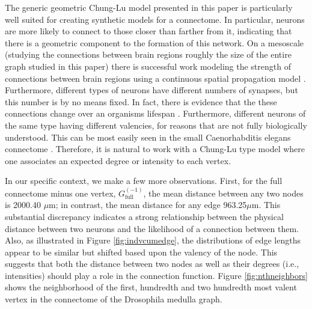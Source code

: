 \documentclass[11]{article}
\newcommand{\fullone}{G_{\textrm{full}}^{(-1)}}
\theoremstyle{remark}
\theoremstyle{definition}
\begin{document}
The generic geometric Chung-Lu model presented in this paper is particularly well suited for creating synthetic models for a connectome. In particular, neurons are more likely to connect to those closer than farther from it, indicating that there is a geometric component to the formation of this network. On a mesoscale (studying the connections between brain regions roughly the size of the entire graph studied in this paper) there is successful work modeling the strength of connections between brain regions using a continuous spatial propagation model \cite{fieldtheory}. Furthermore, different types of neurons have different numbers of synapses, but this number is by no means fixed. In fact, there is evidence that the these connections change over an organisms lifespan \cite{rewiring}. Furthermore, different neurons of the same type having different valencies, for reasons that are not fully biologically understood. This can be most easily seen in the small Caenorhabditis elegans connectome \cite{VarshneyCelegans}. Therefore, it is natural to work with a Chung-Lu type model where one associates an expected degree or intensity to each vertex. 

In our specific context, we make a few more observations. First, for the full connectome minus one vertex, $\fullone$, the mean distance between any two nodes is 2000.40 $\mu$m; in contrast, the mean distance for any edge 963.25$\mu$m. This substantial discrepancy indicates a strong relationship between the physical distance between two neurons and the likelihood of a connection between them. Also, as illustrated in Figure \ref{fig:indvcumedge}, the distributions of edge lengths appear to be similar but shifted based upon the valency of the node. This suggests that both the distance between two nodes as well as their degrees (i.e., intensities) should play a role in the connection function. Figure \ref{fig:nthneighbors} shows the neighborhood of the first, hundredth and two hundredth most valent vertex in the connectome of the Drosophila medulla graph. 
\end{document}
